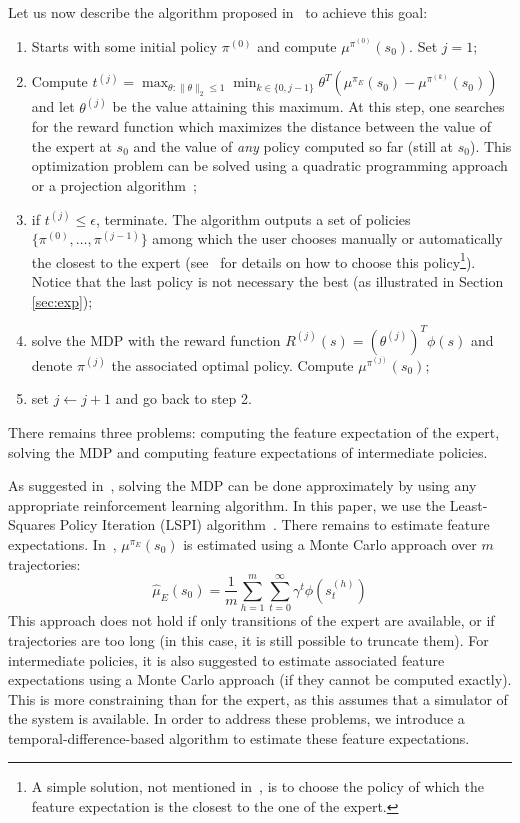 \documentclass{jfpda2011}
\begin{document}
Let us now describe the algorithm proposed in~\citep{abbeel2004apprenticeship} to
achieve this goal:
\begin{enumerate}
  \item Starts with some initial policy $\pi^{(0)}$ and compute
  $\mu^{\pi^{(0)}}(s_0)$. Set $j=1$;
  \item Compute $t^{(j)} = \max_{\theta: \|\theta\|_2\leq 1}
  \min_{k\in\{0,j-1\}}\theta^T(\mu^{\pi_E}(s_0) -
  \mu^{\pi^{(k)}}(s_0))$ and let $\theta^{(j)}$ be the value
  attaining this maximum. At this step, one searches for the reward
  function which maximizes the distance between the value of the
  expert at $s_0$ and the value of \emph{any} policy computed so far
  (still at $s_0$). This optimization problem can be solved using a
  quadratic programming approach or a projection
  algorithm~\citep{abbeel2004apprenticeship};
  \item if $t^{(j)}\leq \epsilon$, terminate. The algorithm outputs a
  set of policies $\{\pi^{(0)}, \dots, \pi^{(j-1)}\}$ among which
  the user chooses manually or automatically the closest to the
  expert (see~\citep{abbeel2004apprenticeship} for details on how to choose this
  policy\footnote{A simple solution, not mentioned in~\citep{abbeel2004apprenticeship},
  is to choose the policy of which the feature expectation is the
  closest to the one of the expert.}).
  Notice that the last policy is not necessary the best (as illustrated in Section \ref{sec:exp});
  \item solve the MDP with the reward function $R^{(j)}(s) =
  (\theta^{(j)})^T\phi(s)$ and denote $\pi^{(j)}$ the associated
  optimal policy. Compute $\mu^{\pi^{(j)}}(s_0)$;
  \item set $j\leftarrow j+1$ and go back to step 2.
\end{enumerate}
There remains three problems: computing the feature expectation of
the expert, solving the MDP and computing feature expectations of
intermediate policies.

As suggested in~\citep{abbeel2004apprenticeship}, solving the MDP can be done
approximately by using any appropriate reinforcement learning
algorithm. In this paper, we use the Least-Squares Policy Iteration
(LSPI) algorithm~\citep{lagoudakis2003least}. There remains to estimate
feature expectations. In~\citep{abbeel2004apprenticeship}, $\mu^{\pi_E}(s_0)$ is
estimated using a Monte Carlo approach over $m$ trajectories:
\begin{equation}
  \hat{\mu}_E(s_0) = \frac{1}{m} \sum_{h=1}^m \sum_{t=0}^\infty
  \gamma^t \phi(s_t^{(h)})
\end{equation}
This approach does not hold if only transitions of the expert are
available, or if trajectories are too long (in this case, it is
still possible to truncate them). For intermediate policies, it is
also suggested to estimate associated feature expectations using a
Monte Carlo approach (if they cannot be computed exactly). This is
more constraining than for the expert, as this assumes that a
simulator of the system is available. In order to address these
problems, we introduce a temporal-difference-based algorithm to
estimate these feature expectations.
\end{document}
